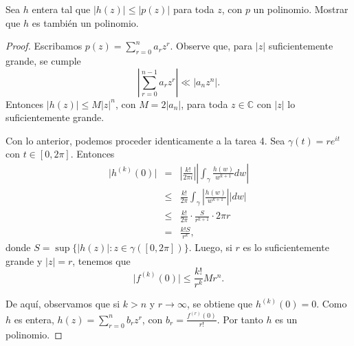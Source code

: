 \documentclass[12pt]{article}
\newcommand{\C}{\mathbb{C}}
\newenvironment{problem}[2][Problema]{\begin{trivlist}
\item[\hskip \labelsep {\bfseries #1}\hskip \labelsep {\bfseries #2.}]}{\end{trivlist}}
\begin{document}
\newpage
\begin{problem}{5} Sea $h$ entera tal que $\lvert h(z) \rvert \leq \lvert p(z) \rvert $ para toda $z$, con $p$ un polinomio. Mostrar que $h$ es también un polinomio. 
\end{problem}
\begin{proof}
Escribamos $p(z) = \sum_{r=0}^n a_r z^r$. Observe que, para $\lvert z \rvert $ suficientemente grande, se cumple 
$$\left\lvert \sum_{r=0}^{n-1} a_r z^r \right\rvert \ll \lvert a_n z^n \rvert.$$
Entonces $\lvert h(z) \rvert  \leq M \lvert z \rvert^n$, con $M = 2 \lvert a_n \rvert $, para toda $z \in \C$ con $\lvert z \rvert$ lo suficientemente grande.

Con lo anterior, podemos proceder identicamente a la tarea 4. Sea $\gamma(t) = re^{it}$ con $t \in [0, 2\pi]$. Entonces 
\begin{eqnarray*}
\lvert h^{(k)}(0) \rvert &=& \left\lvert \frac{k!}{2\pi i} \right\rvert \left\lvert \int_\gamma{\frac{h(w)}{w^{k+1}} dw}\right\rvert\\
&\leq & \frac{k!}{2\pi} \int_\gamma \left\lvert \frac{h(w)}{w^{k+1}} \right\rvert \lvert dw \rvert\\
&\leq& \frac{k!}{2\pi} \cdot \frac{S}{r^{k+1}}\cdot 2\pi r \\
&=& \frac{k! S}{r^k},
\end{eqnarray*}
donde $S = \sup \{ \lvert h(z) \rvert : z \in \gamma([0, 2\pi]) \}$. Luego, si $r$ es lo suficientemente grande y $\lvert z \rvert = r$, tenemos que 
$$\lvert f^{(k)}(0) \rvert \leq \frac{k!}{r^k} M r^n.$$

De aquí, observamos que si $k > n$ y $r \to \infty$, se obtiene que $h^{(k)}(0) = 0$. Como $h$ es entera, $h(z) = \sum_{r=0}^n b_r z^r$, con $b_r = \frac{f^{(r)}(0)}{r!}$. Por tanto $h$ es un polinomio.
\end{proof}
\end{document}
